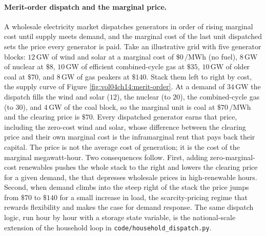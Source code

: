 \paragraph{Merit-order dispatch and the marginal price.} A wholesale
electricity market dispatches generators in order of rising marginal cost
until supply meets demand, and the marginal cost of the last unit
dispatched sets the price every generator is paid. Take an illustrative
grid with five generator blocks: $12\,\si{\giga\watt}$ of wind and solar at
a marginal cost of $\$0\,\si{\per\mega\watt\hour}$ (no fuel), $8\,\si{\giga
\watt}$ of nuclear at $\$8$, $10\,\si{\giga\watt}$ of efficient
combined-cycle gas at $\$35$, $10\,\si{\giga\watt}$ of older coal at $\$70$,
and $8\,\si{\giga\watt}$ of gas peakers at $\$140$. Stack them left to
right by cost, the supply curve of Figure
\ref{fig:vol04ch14:merit-order}. At a demand of $34\,\si{\giga\watt}$ the
dispatch fills the wind and solar ($12$), the nuclear (to $20$), the
combined-cycle gas (to $30$), and $4\,\si{\giga\watt}$ of the coal block,
so the marginal unit is coal at $\$70\,\si{\per\mega\watt\hour}$ and the
clearing price is $\$70$. Every dispatched generator earns that price,
including the zero-cost wind and solar, whose difference between the
clearing price and their own marginal cost is the inframarginal rent that
pays back their capital. The price is not the average cost of generation;
it is the cost of the marginal megawatt-hour. Two consequences follow.
First, adding zero-marginal-cost renewables pushes the whole stack to the
right and lowers the clearing price for a given demand, the
 that depresses wholesale prices in
high-renewable hours. Second, when demand climbs into the steep right of
the stack the price jumps from $\$70$ to $\$140$ for a small increase in
load, the scarcity-pricing regime that rewards flexibility and makes the
case for demand response. The same dispatch logic, run hour by hour with a
storage state variable, is the national-scale extension of the household
loop in \texttt{code/household\_dispatch.py}.



